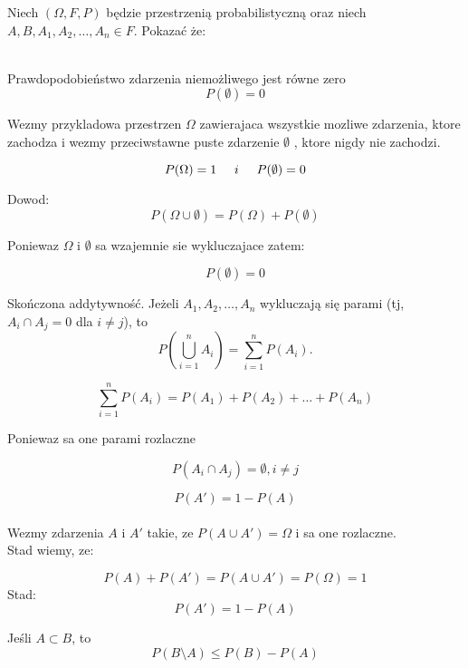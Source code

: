 \documentclass{article}
\begin{document}
	

Niech $(\Omega, F ,P)$ będzie przestrzenią probabilistyczną oraz niech \\ $A,B, A_1,A_2, \ldots, A_n \in F$. Pokazać że:\\ \\

\medskip
{} 
\medskip

Prawdopodobieństwo zdarzenia niemożliwego jest równe zero
$$
P(\emptyset) = 0
$$

Wezmy przykladowa przestrzen $\Omega$ zawierajaca wszystkie mozliwe zdarzenia, ktore zachodza i wezmy przeciwstawne puste zdarzenie $\emptyset$ , ktore nigdy nie zachodzi.


$$ P(\Omega) = 1 \hspace{0.5cm} i \hspace{0.5cm}  P(\emptyset) = 0 $$

Dowod: \\

$$P(\Omega \cup \emptyset) = P(\Omega) + P(\emptyset)$$

Poniewaz $\Omega$ i $\emptyset$ sa wzajemnie sie wykluczajace zatem: 

$$ P(\emptyset) = 0 $$

\medskip
{} 
\medskip


Skończona addytywność. Jeżeli $A_1,A_2, \ldots, A_n$ wykluczają się parami (tj, $A_i \cap A_j = 0$ dla $i \neq j$), to
$$
P\left(\bigcup_{i=1}^{n} A_i \right) = \sum_{i=1}^{n} P(A_i).
$$

$$\sum_{i=1}^{n} P(A_i) = P(A_1) + P(A_2) + \ldots + P(A_n)$$

Poniewaz sa one parami rozlaczne 

$$ P(A_i \cap A_j) = \emptyset , i \neq j$$

\medskip
{} 
\medskip

$$
P(A') = 1 - P(A)
$$\\

Wezmy zdarzenia $A$ i $A'$ takie, ze $P(A \cup A') = \Omega$ i sa one rozlaczne.\\

Stad wiemy, ze:

$$P(A) + P(A') = P(A \cup A') = P(\Omega) = 1$$
Stad:
$$P(A') = 1 - P(A)$$


\medskip
{} 
\medskip

Jeśli $A \subset B$, to 
$$
P(B \setminus A) \leq P(B) - P(A)
$$\\\\
\end{document}

